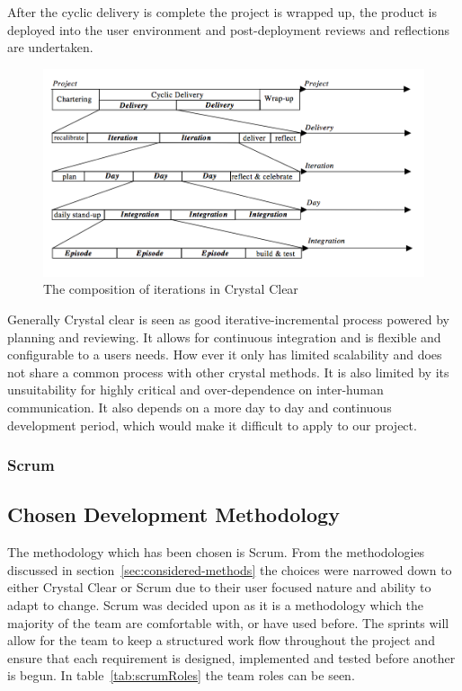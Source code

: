 \documentclass[11pt,a4paper]{article}
\begin{document}
After the cyclic delivery is complete the project is wrapped up, the product is deployed into the user environment and post-deployment reviews and reflections are undertaken. 

\begin{figure}[H]
\centering
\includegraphics[width = 140mm]{clear.png}
\caption{The composition of iterations in Crystal Clear ~\cite{Cockburn}}
\label{fig:clear}
\end{figure}

Generally Crystal clear is seen as good iterative-incremental process powered by planning and reviewing. It allows for continuous integration and is flexible and configurable to a users needs. How ever it only has limited scalability and does not share a common process with other crystal methods. It is also limited by its unsuitability for highly critical and over-dependence on inter-human communication. It also depends on a more day to day and continuous development period, which would make it difficult to apply to our project. 


\subsubsection{Scrum}

\subsection{Chosen Development Methodology}
\label{sec:chosen-method}

The methodology which has been chosen is Scrum. From the methodologies discussed in section~\ref{sec:considered-methods} the choices were narrowed down to either Crystal Clear or Scrum due to their user focused nature and ability to adapt to change. Scrum was decided upon as it is a methodology which the majority of the team are comfortable with, or have used before. The sprints will allow for the team to keep a structured work flow throughout the project and ensure that each requirement is designed, implemented and tested before another is begun. In table~\ref{tab:scrumRoles} the team roles can be seen.
\end{document}
